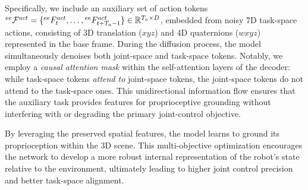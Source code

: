 \documentclass[runningheads]{llncs}
\begin{document}
Specifically, we include an auxiliary set of action tokens $^{ee}\mathcal{F}^{act} = \{^{ee}F^{act}_{t}, \dots,\\ ^{ee}F^{act}_{t+T_a-1}\} \in \mathbb{R}^{T_a \times D}$, embedded from noisy 7D task-space actions, consisting of 3D translation ($xyz$) and 4D quaternions ($wxyz$) represented in the base frame. During the diffusion process, the model simultaneously denoises both joint-space and task-space tokens. Notably, we employ a \emph{causal attention mask} within the self-attention layers of the decoder: while task-space tokens \emph{attend to} joint-space tokens, the joint-space tokens do not attend to the task-space ones. This unidirectional information flow ensures that the auxiliary task provides features for proprioceptive grounding without interfering with or degrading the primary joint-control objective. 

By leveraging the preserved spatial features, the model learns to ground its proprioception within the 3D scene. This multi-objective optimization encourages the network to develop a more robust internal representation of the robot's state relative to the environment, ultimately leading to higher joint control precision and better task-space alignment.
\end{document}
